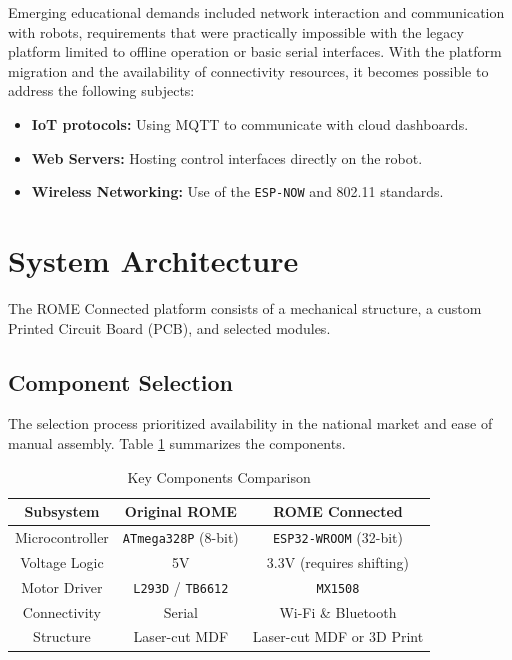 \documentclass[conference]{IEEEtran}
\begin{document}
Emerging educational demands included network interaction and communication with robots, requirements that were practically impossible with the legacy platform limited to offline operation or basic serial interfaces. With the platform migration and the availability of connectivity resources, it becomes possible to address the following subjects:

\begin{itemize}
    \item \textbf{IoT protocols:} Using MQTT to communicate with cloud dashboards.
    \item \textbf{Web Servers:} Hosting control interfaces directly on the robot.
    \item \textbf{Wireless Networking:} Use of the \texttt{ESP-NOW} and 802.11 standards.
\end{itemize}

\section{System Architecture}

The ROME Connected platform consists of a mechanical structure, a custom Printed Circuit Board (PCB), and selected modules.

\subsection{Component Selection}

The selection process prioritized availability in the national market and ease of manual assembly. Table \ref{tab:components} summarizes the components.

\begin{table}[htbp]
\caption{Key Components Comparison}
\begin{center}
\begin{tabular}{|c|c|c|}
\hline
\textbf{Subsystem} & \textbf{Original ROME} & \textbf{ROME Connected} \\
\hline
Microcontroller & \texttt{ATmega328P} (8-bit) & \texttt{ESP32-WROOM} (32-bit) \\
\hline
Voltage Logic & 5V & 3.3V (requires shifting) \\
\hline
Motor Driver & \texttt{L293D} / \texttt{TB6612} & \texttt{MX1508} \\
\hline
Connectivity & Serial & Wi-Fi \& Bluetooth \\
\hline
Structure & Laser-cut MDF & Laser-cut MDF or 3D Print \\
\hline
\end{tabular}
\label{tab:components}
\end{center}
\end{table}
\end{document}
